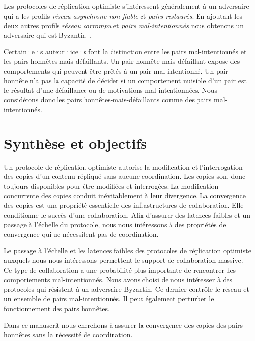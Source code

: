 Les protocoles de réplication optimiste s'intéressent généralement à un adversaire qui a les profils \emph{réseau asynchrone non-fiable} et \emph{pairs restaurés}.
En ajoutant les deux autres profils \emph{réseau corrompu} et \emph{pairs mal-intentionnés} nous obtenons un adversaire qui est Byzantin~\autocite{lamport_1982_byzantinegeneralsproblem}.

Certain·e·s auteur·ice·s font la distinction entre les pairs mal-intentionnés et les pairs honnêtes-mais-défaillants.
Un pair honnête-mais-défaillant expose des comportements qui peuvent être prêtés à un pair mal-intentionné.
Un pair honnête n'a pas la capacité de décider si un comportement nuisible d'un pair est le résultat d'une défaillance ou de motivations mal-intentionnées.
Nous considérons donc les pairs honnêtes-mais-défaillants comme des pairs mal-intentionnés.


\section{Synthèse et objectifs}

Un protocole de réplication optimiste autorise la modification et l'interrogation des copies d'un contenu répliqué sans aucune coordination.
Les copies sont donc toujours disponibles pour être modifiées et interrogées.
La modification concurrente des copies conduit inévitablement à leur divergence.
La convergence des copies est une propriété essentielle des infrastructures de collaboration.
Elle conditionne le succès d'une collaboration.
Afin d'assurer des latences faibles et un passage à l'échelle du protocole, nous nous intéressons à des propriétés de convergence qui ne nécessitent pas de coordination.

Le passage à l'échelle et les latences faibles des protocoles de réplication optimiste auxquels nous nous intéressons permettent le support de collaboration massive.
Ce type de collaboration a une probabilité plus importante de rencontrer des comportements mal-intentionnés.
Nous avons choisi de nous intéresser à des protocoles qui résistent à un adversaire Byzantin.
Ce dernier contrôle le réseau et un ensemble de pairs mal-intentionnés.
Il peut également perturber le fonctionnement des pairs honnêtes.

Dans ce manuscrit nous cherchons à assurer la convergence des copies des pairs honnêtes sans la nécessité de coordination.
